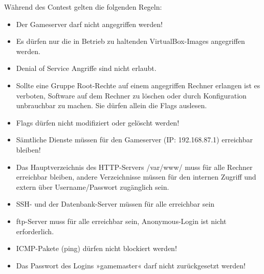 Während des Contest gelten die folgenden Regeln:
\begin{itemize}
\item Der Gameserver darf nicht angegriffen werden!
\item Es dürfen nur die in Betrieb zu haltenden VirtualBox-Images angegriffen werden.
\item Denial of Service Angriffe sind nicht erlaubt.
\item Sollte eine Gruppe Root-Rechte auf einem angegriffen Rechner erlangen ist es verboten, Software auf
dem Rechner zu löschen oder durch Konfiguration unbrauchbar zu machen. Sie dürfen allein die Flags
auslesen.
\item Flags dürfen nicht modifiziert oder gelöscht werden!
\item Sämtliche Dienste müssen für den Gameserver (IP: 192.168.87.1) erreichbar bleiben!
\item Das Hauptverzeichnis des HTTP-Servers /var/www/ muss für alle Rechner erreichbar bleiben, andere
Verzeichnisse müssen für den internen Zugriff und extern über Username/Passwort zugänglich sein.
\item SSH- und der Datenbank-Server müssen für alle erreichbar sein
\item ftp-Server muss für alle erreichbar sein, Anonymous-Login ist nicht erforderlich.
\item ICMP-Pakete (ping) dürfen nicht blockiert werden!
\item  Das Passwort des Logins »gamemaster« darf nicht zurückgesetzt werden!
\end{itemize} \cite[S.9]{quadePraktikumITSecurity2017}\cite[S.10-11]{sosnaKonzeptionUndRealisierung2010}